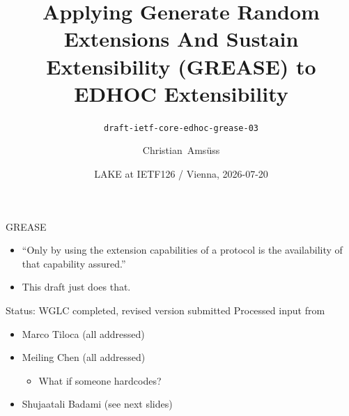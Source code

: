 

\title[Applying GREASE to EDHOC]{Applying Generate Random Extensions And Sustain Extensibility (GREASE) to EDHOC Extensibility}
\subtitle{\texttt{draft-ietf-core-edhoc-grease-03}}
\author{Christian~Amsüss}
\date{LAKE at IETF126 / Vienna, 2026-07-20}



\frame{\titlepage}

\begin{frame}{GREASE}\Large
  \begin{itemize}
  \color{gray}
    \item ``Only by using the extension capabilities of a protocol is the availability of that capability assured.'' 
    \item This draft just does that.
  \end{itemize}
\end{frame}

\begin{frame}{Status: WGLC completed, revised version submitted}\Large
  Processed input from
  \begin{itemize}
    \item Marco Tiloca (all addressed)
    \item Meiling Chen (all addressed)
      \begin{itemize}
        \item \Large What if someone hardcodes?
      \end{itemize}
    \item Shujaatali Badami (see next slides)
  \end{itemize}
\end{frame}

